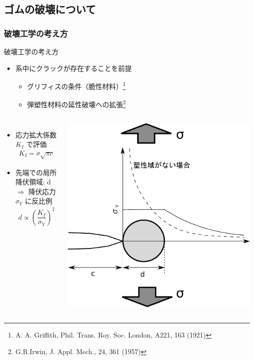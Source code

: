 \documentclass[12pt, dvipdfmx]{beamer}
\begin{document}
\subsection{ゴムの破壊について}
\begin{frame}
    \frametitle{破壊工学の考え方}
	\vspace{-2mm}
    \begin{exampleblock}{破壊工学の考え方}
		\begin{itemize}
			\item 系中に\alert{クラックが存在することを前提}
			\begin{itemize}
				\item グリフィスの条件（脆性材料）\footnote[1]{
					A. A. Griffith, Phil. Trans. Roy. Soc. London, A221, 163 (1921)
					}
					\item 弾塑性材料の延性破壊への拡張\footnote[2]{
						G.R.Irwin, J. Appl. Mech., 24, 361 (1957)
						}
			\end{itemize}
		\end{itemize}
	\end{exampleblock}
	\vspace{-2mm}
	\begin{columns}
			\begin{itemize}
				\item
				\alert{応力拡大係数 $K_I$} で評価
				\footnotesize
				\begin{align*}
				K_{I} = \sigma \sqrt{\pi c}
				\end{align*}
				\normalsize
				\item 
				先端での\alert{局所降伏領域: d}\\
				$\Rightarrow$ 降伏応力 $\sigma_Y$ に反比例
				\footnotesize
				\begin{align*}
				d \propto \left( \dfrac{K_I}{\sigma_Y} \right)^2
				\end{align*}
				\normalsize
			\end{itemize}
			\centering
			\includegraphics[width=.82\textwidth]{./Crack_Yield.pdf}
		\end{columns}
\end{frame}
\end{document}
